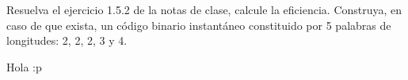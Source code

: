 
Resuelva el ejercicio 1.5.2 de la notas de clase, calcule la eficiencia.
Construya, en caso de que exista, un código binario instantáneo constituido por 5 palabras de longitudes: 2, 2, 2, 3 y 4.
\begin{sol}
    Hola :p
\end{sol}